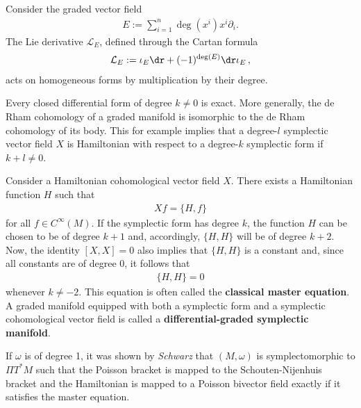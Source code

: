    \begin{property}
        Consider the graded vector field
        \begin{gather}
            E := \sum_{i=1}^n\deg(x^i)x^i\partial_i.
        \end{gather}
        The Lie derivative $\mathcal{L}_E$, defined through the Cartan formula
        \begin{gather}
            \mathcal{L}_E := \iota_E\dr + (-1)^{\deg(E)}\dr\iota_E\,,
        \end{gather}
        acts on homogeneous forms by multiplication by their degree.
    \end{property}
    \begin{property}\label{hdg:global_exactness}
        Every closed differential form of degree $k\neq0$ is exact. More generally, the de Rham cohomology of a graded manifold is isomorphic to the de Rham cohomology of its body. This for example implies that a degree-$l$ symplectic vector field $X$ is Hamiltonian with respect to a degree-$k$ symplectic form if $k+l\neq0$.
    \end{property}
    \begin{result}
        Consider a Hamiltonian cohomological vector field $X$. There exists a Hamiltonian function $H$ such that
        \begin{gather}
            Xf = \{H,f\}
        \end{gather}
        for all $f\in C^\infty(M)$. If the symplectic form has degree $k$, the function $H$ can be chosen to be of degree $k+1$ and, accordingly, $\{H,H\}$ will be of degree $k+2$. Now, the identity $[X,X] = 0$ also implies that $\{H,H\}$ is a constant and, since all constants are of degree 0, it follows that
        \begin{gather}
            \label{hdg:classical_master_equation}
            \{H,H\}=0
        \end{gather}
        whenever $k\neq-2$. This equation is often called the \textbf{classical master equation}. A graded manifold equipped with both a symplectic form and a symplectic cohomological vector field is called a \textbf{differential-graded symplectic manifold}.

        If $\omega$ is of degree 1, it was shown by \textit{Schwarz} that $(M,\omega)$ is symplectomorphic to $\Pi T^*M$ such that the Poisson bracket is mapped to the Schouten-Nijenhuis bracket and the Hamiltonian is mapped to a Poisson bivector field exactly if it satisfies the master equation.
    \end{result}

